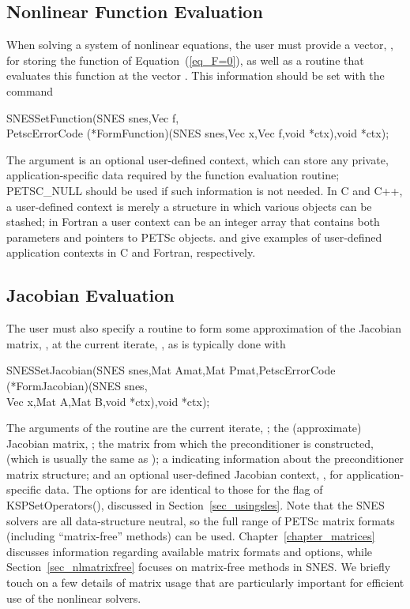 \subsection{Nonlinear Function Evaluation}
\label{sec_snesfunction}

When solving a system of nonlinear equations, the user must provide
a vector, , for storing the function of
Equation~(\ref{eq_F=0}), as well as a routine that evaluates this
function at the vector .  This information should be set with
the command
\begin{tabbing}
  SNESSetFunction(SNES snes,Vec f,\\
          PetscErrorCode (*FormFunction)(SNES snes,Vec x,Vec f,void *ctx),void *ctx);
\end{tabbing}
The argument  is an optional user-defined context, which can
store any private, application-specific data required by the
function evaluation routine; PETSC\_NULL should be used if such information
is not needed.  In C and C++, a user-defined context is merely a
structure in which various objects can be stashed; in Fortran a user
context can be an integer array that contains both parameters and
pointers to PETSc objects.  and
 give examples of user-defined
application contexts in C and Fortran, respectively.

\subsection{Jacobian Evaluation}
\label{sec_snesjacobian}

The user must also specify a routine to form some approximation of the
Jacobian matrix, , at the current iterate, ,
as is typically done with
\begin{tabbing}
  SNESSetJacobian(SNES snes,Mat Amat,Mat Pmat,PetscErrorCode (*FormJacobian)(SNES snes,\\
          Vec x,Mat A,Mat B,void *ctx),void *ctx);
\end{tabbing}
The arguments of the routine  are the current iterate, ; the (approximate) Jacobian matrix,
; the matrix from which the preconditioner is constructed,  (which is usually the same
as ); a  indicating information about the
preconditioner matrix structure; and an optional user-defined Jacobian
context, , for application-specific data.  The options for
 are identical to those for the flag of KSPSetOperators(), discussed in Section~\ref{sec_usingsles}.
Note that the SNES solvers are all data-structure neutral, so the full
range of PETSc matrix formats (including ``matrix-free''
methods) can be used.  Chapter~\ref{chapter_matrices} discusses
information regarding available matrix formats and options, while
Section~\ref{sec_nlmatrixfree} focuses on matrix-free
methods in SNES. We briefly touch on a few details of matrix usage that are
particularly important for efficient use of the nonlinear solvers.

